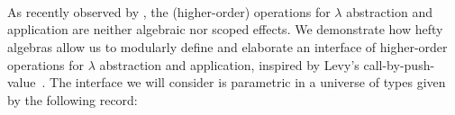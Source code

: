 \begin{code}[hide]%
\>[0]\AgdaSpace{}%
\AgdaSpace{}%
\<%
\\
\>[0][@{}l@{\AgdaIndent{0}}]%
\>[2]\AgdaSpace{}%
\AgdaSpace{}%
\AgdaSpace{}%
\AgdaSymbol{(}\AgdaSymbol{;}\AgdaSpace{}%
\AgdaOperator{\AgdaFunction{\AgdaUnderscore{}>>\AgdaUnderscore{}}}\AgdaSymbol{)}\<%
\\
%
\>[2]\AgdaSpace{}%
\AgdaSpace{}%
\AgdaSpace{}%
\AgdaSymbol{(}\AgdaSymbol{;}\AgdaSpace{}%
\AgdaOperator{\AgdaFunction{\AgdaUnderscore{}>>\AgdaUnderscore{}}}\AgdaSymbol{)}\<%
\\
%
\>[2]\AgdaSpace{}%
\<%
\\
%
\>[2]\AgdaSpace{}%
\<%
\\
%
\>[2]\AgdaSpace{}%
\<%
\\
%
\>[2]\AgdaSpace{}%
\<%
\\
%
\>[2]\AgdaSpace{}%
\<%
\\
%
\>[2]\AgdaSpace{}%
\AgdaSpace{}%
\AgdaSpace{}%
\AgdaSpace{}%
\<%
\end{code}

As recently observed by \citet{BergSPW21}, the (higher-order) operations for $\lambda$ abstraction and application are neither algebraic nor scoped effects.
We demonstrate how hefty algebras allow us to modularly define and elaborate an interface of higher-order operations for $\lambda$ abstraction and application, inspired by Levy's call-by-push-value~\citep{Levy06}.
The interface we will consider is parametric in a universe of types given by the following record:


